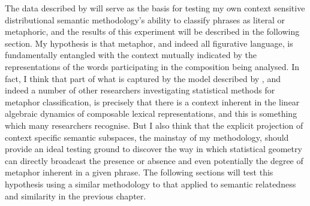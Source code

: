 The data described by \citeauthor{GutierrezEA2016} will serve as the basis for testing my own context sensitive distributional semantic methodology's ability to classify phrases as literal or metaphoric, and the results of this experiment will be described in the following section.  My hypothesis is that metaphor, and indeed all figurative language, is fundamentally entangled with the context mutually indicated by the representations of the words participating in the composition being analysed.  In fact, I think that part of what is captured by the model described by \citeauthor{GutierrezEA2016}, and indeed a number of other researchers investigating statistical methods for metaphor classification, is precisely that there is a context inherent in the linear algebraic dynamics of composable lexical representations, and this is something which many researchers recognise.  But I also think that the explicit projection of context specific semantic subspaces, the mainstay of my methodology, should provide an ideal testing ground to discover the way in which statistical geometry can directly broadcast the presence or absence and even potentially the degree of metaphor inherent in a given phrase.  The following sections will test this hypothesis using a similar methodology to that applied to semantic relatedness and similarity in the previous chapter.  


